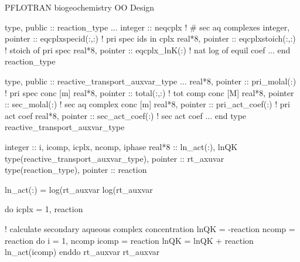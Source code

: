 \documentclass{beamer}
\newcommand\bluecolor[1]{{{\color{blue} #1}}}
\newcommand\greencolor[1]{{{\color{green} #1}}}
\begin{document}
\begin{frame}{PFLOTRAN biogeochemistry OO Design}
\scriptsize
\begin{semiverbatim}
    \bluecolor{type}, \bluecolor{public} :: reaction_type
      ...
     \bluecolor{integer} :: neqcplx                     \greencolor{! # sec aq complexes}
      \bluecolor{integer}, \bluecolor{pointer} :: eqcplxspecid(:,:)  \greencolor{! pri spec ids in cplx}
      \bluecolor{real*8}, \bluecolor{pointer} :: eqcplxstoich(:,:)   \greencolor{! stoich of pri spec}
      \bluecolor{real*8}, \bluecolor{pointer} :: eqcplx_lnK(:)       \greencolor{! nat log of equil coef}
      ...
    \bluecolor{end} reaction_type

    \bluecolor{type}, \bluecolor{public} :: reactive_transport_auxvar_type
      ...
      \bluecolor{real*8}, \bluecolor{pointer} :: pri_molal(:)     \greencolor{! pri spec conc [m]}
      \bluecolor{real*8}, \bluecolor{pointer} :: total(:,:)       \greencolor{! tot comp conc [M]}
      \bluecolor{real*8}, \bluecolor{pointer} :: sec_molal(:)     \greencolor{! sec aq complex conc [m]}
      \bluecolor{real*8}, \bluecolor{pointer} :: pri_act_coef(:)  \greencolor{! pri act coef}
      \bluecolor{real*8}, \bluecolor{pointer} :: sec_act_coef(:)  \greencolor{! sec act coef}
      ...
    \bluecolor{end type} reactive_transport_auxvar_type
\end{semiverbatim}

\newpage



\tiny
\begin{semiverbatim}
          \bluecolor{integer} :: i, icomp, icplx, ncomp, iphase
          \bluecolor{real*8} :: ln_act(:), lnQK
          \bluecolor{type}(reactive_transport_auxvar_type), \bluecolor{pointer} :: rt_axuvar
          \bluecolor{type}(reaction_type), \bluecolor{pointer} :: reaction

          ln_act(:) = \bluecolor{log}(rt_auxvar%
                      \bluecolor{log}(rt_auxvar%

          \bluecolor{do} icplx = 1, reaction%

            \greencolor{! calculate secondary aqueous complex concentration}
            lnQK = -reaction%
            ncomp = reaction%
            \bluecolor{do} i = 1, ncomp
              icomp = reaction%
              lnQK = lnQK + reaction%
                            ln_act(icomp)
            \bluecolor{enddo}
            rt_auxvar%
                               rt_auxvar%


\end{semiverbatim}
\end{frame}
\end{document}
